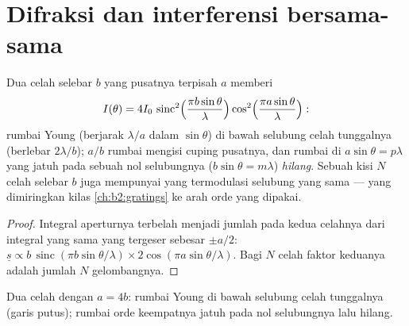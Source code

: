 \section{Difraksi dan interferensi bersama-sama}

\begin{proposition}\label{prop:b2:diffraction:combined}
Dua celah selebar $b$ yang pusatnya terpisah $a$ memberi
\[
I(\theta) = 4I_0\,\operatorname{sinc}^2\Bigl(\frac{\pi b\sin\theta}\lambda\Bigr)\cos^2\Bigl(\frac{\pi a\sin\theta}\lambda\Bigr) :
\]
rumbai Young (berjarak $\lambda/a$ dalam $\sin\theta$) di bawah selubung
celah tunggalnya (berlebar $2\lambda/b$); $a/b$ rumbai mengisi cuping pusatnya, dan
rumbai di $a\sin\theta = p\lambda$ yang jatuh pada sebuah nol selubungnya
($b\sin\theta = m\lambda$) \emph{hilang}. Sebuah kisi $N$ celah selebar
$b$ juga mempunyai  yang termodulasi selubung yang sama ---
yang dimiringkan kilas \cref{ch:b2:gratings} ke arah orde yang dipakai.
\end{proposition}

\begin{proof}
Integral aperturnya terbelah menjadi jumlah pada kedua celahnya dari integral
yang sama yang tergeser sebesar $\pm a/2$: $\underline s \propto b\,\operatorname{sinc}(\pi b\sin\theta/\lambda)
\times2\cos(\pi a\sin\theta/\lambda)$. Bagi $N$ celah faktor keduanya adalah
jumlah $N$ gelombangnya.
\end{proof}

\begin{omfigure}

{\small Dua celah dengan $a = 4b$: rumbai Young di bawah selubung
celah tunggalnya (garis putus); rumbai orde keempatnya jatuh pada nol
selubungnya lalu hilang.}
\end{omfigure}

